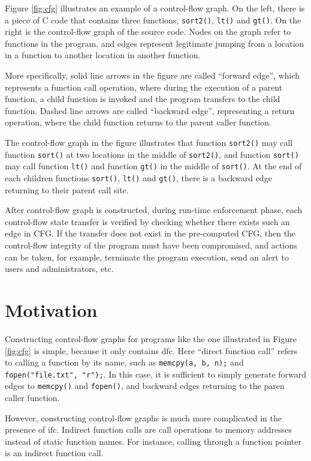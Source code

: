 Figure \ref{fig:cfg} illustrates an example of a control-flow graph. On the left, there is a piece of C code that contains three functions, \texttt{sort2()}, \texttt{lt()} and \texttt{gt()}. On the right is the control-flow graph of the source code. Nodes on the graph refer to functions in the program, and edges represent legitimate jumping from a location in a function to another location in another function.

More specifically, solid line arrows in the figure are called ``forward edge'', which represents a function call operation, where during the execution of a parent function, a child function is invoked and the program transfers to the child function. Dashed line arrows are called ``backward edge'', representing a return operation, where the child function returns to the parent caller function.

The control-flow graph in the figure illustrates that function \texttt{sort2()} may call function \texttt{sort()} at two locations in the middle of \texttt{sort2()}, and function \texttt{sort()} may call function \texttt{lt()} and function \texttt{gt()} in the middle of \texttt{sort()}. At the end of each children functions \texttt{sort()}, \texttt{lt()} and \texttt{gt()}, there is a backward edge returning to their parent call site.

After control-flow graph is constructed, during run-time enforcement phase, each control-flow state transfer is verified by checking whether there exists such an edge in CFG. If the transfer does not exist in the pre-computed CFG, then the control-flow integrity of the program must have been compromised, and actions can be taken, for example, terminate the program execution, send an alert to users and administrators, etc.

\section{Motivation}
\label{section:motivation}

Constructing control-flow graphs for programs like the one illustrated in Figure \ref{fig:cfg} is simple, because it only contains \ac{dfc}. Here ``direct function call'' refers to calling a function by its name, such as \texttt{memcpy(a, b, n);} and \texttt{fopen("file.txt", "r");}. In this case, it is sufficient to simply generate forward edges to \texttt{memcpy()} and \texttt{fopen()}, and backward edges returning to the paren caller function.

However, constructing control-flow graphs is much more complicated in the presence of \ac{ifc}. Indirect function calls are call operations to memory addresses instead of static function names. For instance, calling through a function pointer is an indirect function call.

